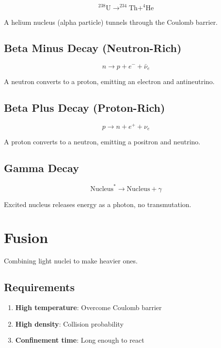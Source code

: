 \documentclass[
  11pt,
  letterpaper,
  twoside,
  openright]{book}
\providecommand{\tightlist}{%
  \setlength{\itemsep}{0pt}\setlength{\parskip}{0pt}}
\begin{document}
\[
^{238}\text{U} \rightarrow ^{234}\text{Th} + ^{4}\text{He}
\]

A helium nucleus (alpha particle) tunnels through the Coulomb barrier.

\subsection{Beta Minus Decay
(Neutron-Rich)}\label{beta-minus-decay-neutron-rich}

\[
n \rightarrow p + e^- + \bar{\nu}_e
\]

A neutron converts to a proton, emitting an electron and antineutrino.

\subsection{Beta Plus Decay
(Proton-Rich)}\label{beta-plus-decay-proton-rich}

\[
p \rightarrow n + e^+ + \nu_e
\]

A proton converts to a neutron, emitting a positron and neutrino.

\subsection{Gamma Decay}\label{gamma-decay}

\[
\text{Nucleus}^* \rightarrow \text{Nucleus} + \gamma
\]

Excited nucleus releases energy as a photon, no transmutation.

\section{Fusion}\label{fusion}

Combining light nuclei to make heavier ones.

\subsection{Requirements}\label{requirements}

\begin{enumerate}
\def\labelenumi{\arabic{enumi}.}
\tightlist
\item
  \textbf{High temperature}: Overcome Coulomb barrier
\item
  \textbf{High density}: Collision probability
\item
  \textbf{Confinement time}: Long enough to react
\end{enumerate}
\end{document}
